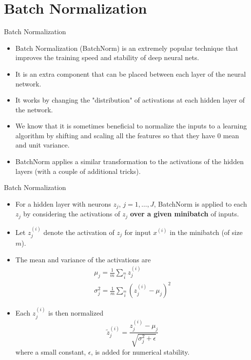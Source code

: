 \section{Batch Normalization}

\begin{frame} {Batch Normalization}
  \begin{itemize}
    \item Batch Normalization (BatchNorm) is an extremely popular technique that improves the training speed and stability of deep neural nets.
    \item It is an extra component that can be placed between each layer of the neural network.
    \item It works by changing the "distribution" of activations at each hidden layer of the network.
    \item We know that it is sometimes beneficial to normalize the inputs to a learning algorithm by shifting and scaling all the features so that they have 0 mean and unit variance.
    \item%
     BatchNorm applies a similar transformation to the activations of the hidden layers (with a couple of additional tricks).
  \end{itemize}
\end{frame}

\begin{frame} {Batch Normalization}
  \small
  \begin{itemize}
    \setlength{\itemsep}{1pt}
    \item For a hidden layer with neurons $z_j$, $j=1, \dots, J$, BatchNorm is applied to each $z_j$ by considering the activations of $z_j$ \textbf{over a given minibatch} of inputs.
    \item Let $z_j^{(i)}$ denote the activation of $z_j$ for input $x^{(i)}$ in the minibatch (of size $m$).
    \item The mean and variance of the activations are
      \begin{equation*}
          \begin{array}{l}
            \mu_j = \frac{1}{m} \sum \limits_i \limits^m z_j^{(i)} \\
            \sigma^2_j = \frac{1}{m} \sum \limits_i \limits^m (z_j^{(i)} - \mu_j)^2
          \end{array}
      \end{equation*}
    \item Each $z_j^{(i)}$ is then normalized 
        \begin{equation*}
          \tilde z_j^{(i)} = \frac {z_j^{(i)} - \mu_j}{\sqrt{\sigma^2_j + \epsilon}}
        \end{equation*}
        where a small constant, $\epsilon$, is added for numerical stability.
  \end{itemize}
\end{frame}


